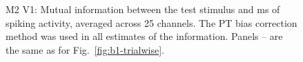 \begin{figure}[htbp]
\begin{subfigure}[b]{0.5\linewidth}
    \end{subfigure}
    \caption{\small{}M2 V1: Mutual information between the test stimulus and \unit[20]{ms} of spiking activity, averaged across 25 channels.
The PT bias correction method was used in all estimates of the information.
Panels -- are the same as for Fig.~\ref{fig:b1-trialwise}.
}
    \label{fig:j1-trialwise}
\end{figure}

